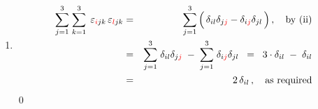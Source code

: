 \begin{enumerate}
\begin{eqnarray*}
\begin{array}{ccc}
                \delta_{jl} & \delta_{jm}
                \end{array}\right)
            \,\right]
    \\
    & = &
        \overset{3}{\underset{k=1}{\sum}}\;
        \delta_{ik}\left(\,\delta_{jl}\delta_{km} - \delta_{jm}\delta_{kl}\,\right)
        \,-\,
        \overset{3}{\underset{k=1}{\sum}}\;
        \delta_{jk}\left(\,\delta_{il}\delta_{km} - \delta_{im}\delta_{kl}\,\right)
        \,+\,
        \overset{3}{\underset{k=1}{\sum}}\;
        \delta_{kk}\left(\,\delta_{il}\delta_{jm} - \delta_{im}\delta_{jl}\,\right)
    \\
    & = &
        \left(\,\delta_{jl}\delta_{im} - \delta_{jm}\delta_{il}\,\right)
        \,-\,
        \left(\,\delta_{il}\delta_{jm} - \delta_{im}\delta_{jl}\,\right)
        \,+\,
        \left(\,\delta_{il}\delta_{jm} - \delta_{im}\delta_{jl}\,\right)
        \cdot
        \overset{3}{\underset{k=1}{\sum}}\;\delta_{kk}
    \\
    & = &
        \left(\,
            \delta_{il}\delta_{jm}
            \overset{{\color{white}.}}{-}
            \delta_{im}\delta_{jl}
            \,\right)
        \cdot
        \left(\,
            -\,1 \,-\, 1 \,+\, 3
            \,\right)
    \\
    & = &
        \delta_{il}\delta_{jm}
        \overset{{\color{white}.}}{-}
        \delta_{im}\delta_{jl}\,,
        \quad
        \textnormal{as required}
    \end{eqnarray*}
\item
    \begin{eqnarray*}
    \overset{3}{\underset{j=1}{\sum}}\;
    \overset{3}{\underset{k=1}{\sum}}\;\,
    \varepsilon_{{\color{red}i}jk}\,
    \varepsilon_{{\color{red}l}jk}
    & = &
        \overset{3}{\underset{j=1}{\sum}}
        \left(\,
            \delta_{il}\delta_{j{\color{red}j}}
            \overset{{\color{white}.}}{-}
            \delta_{i{\color{red}j}}\delta_{jl}
            \,\right),
        \quad
        \textnormal{by (ii)}
    \\
    & = &
        \overset{3}{\underset{j=1}{\sum}}\;
        \delta_{il}\delta_{j{\color{red}j}}
        \;\overset{{\color{white}.}}{-}\;
        \overset{3}{\underset{j=1}{\sum}}\;
        \delta_{i{\color{red}j}}\delta_{jl}
    \;\; = \;\;
        3 \cdot \delta_{il}
        \;\overset{{\color{white}.}}{-}\;
        \delta_{il}
    \\
    & = &
        2\,\delta_{{\color{black}il}}\,,
        \quad
        \textnormal{as required}
    \end{eqnarray*}
\vskip -0.8cm
\qed
\end{enumerate}


